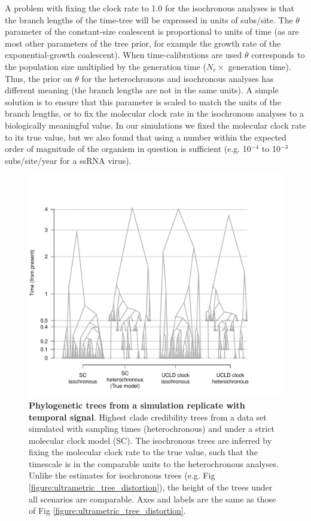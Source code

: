\documentclass[10pt,letterpaper]{article}
\begin{document}
A problem with fixing the clock rate to 1.0 for the isochronous analyses is that the branch lengths of the time-tree will be expressed in units of subs/site. The $\theta$ parameter of the constant-size coalescent is proportional to units of time \cite{ho2011skyline, drummond2002estimating} (as are most other parameters of the tree prior, for example the growth rate of the exponential-growth coalescent). When time-calibrations are used $\theta$ corresponds to the population size multiplied by the generation time ($N_e \times$ generation time). Thus, the prior on $\theta$ for the heterochronous and isochronous analyses has different meaning (the branch lengths are not in the same units). A simple solution is to ensure that this parameter is scaled to match the units of the branch lengths, or to fix the molecular clock rate in the isochronous analyses to a biologically meaningful value. In our simulations we fixed the molecular clock rate to its true value, but we also found that using a number within the expected order of magnitude of the organism in question is sufficient (e.g. 10$^{-4}$ to 10$^{-3}$ subs/site/year for a ssRNA virus).

\begin{figure}[!h]
	\begin{center}
		\includegraphics[width=15cm]{sandbox_figures/figure_4.pdf}\newline
		\vspace{-0.5cm}
		\caption{\textbf{Phylogenetic trees from a simulation replicate with temporal signal}. Highest clade credibility trees from a data set simulated with sampling times (heterochronous) and under a strict molecular clock model (SC). The isochronous trees are inferred by fixing the molecular clock rate to the true value, such that the timescale is in the comparable units to the heterochronous analyses. Unlike the estimates for isochronous trees (e.g. Fig \ref{figure:ultrametric_tree_distortion}), the height of the trees  under all scenarios are comparable. Axes and labels are the same as those of Fig \ref{figure:ultrametric_tree_distortion}.}
		\label{figure:heterochronous_tree_distortion}
	\end{center}
\end{figure}
\end{document}

